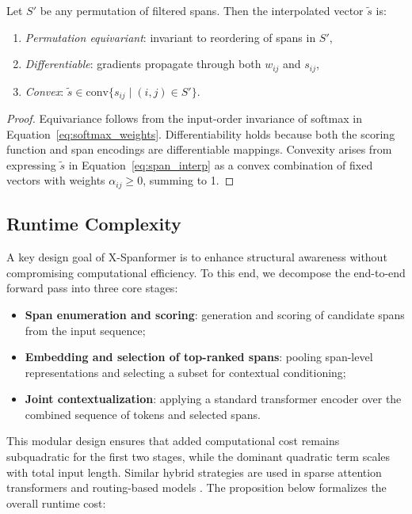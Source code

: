 \begin{proposition}
Let \( S' \) be any permutation of filtered spans. Then the interpolated vector \( \tilde{s} \) is:
\begin{enumerate}
  \item \emph{Permutation equivariant}: invariant to reordering of spans in \( S' \),
  \item \emph{Differentiable}: gradients propagate through both \( w_{ij} \) and \( s_{ij} \),
  \item \emph{Convex}: \( \tilde{s} \in \mathrm{conv}\{s_{ij} \mid (i,j) \in S'\} \).
\end{enumerate}
\end{proposition}

\begin{proof}
Equivariance follows from the input-order invariance of softmax in Equation~\ref{eq:softmax_weights}. Differentiability holds because both the scoring function and span encodings are differentiable mappings. Convexity arises from expressing \( \tilde{s} \) in Equation~\ref{eq:span_interp} as a convex combination of fixed vectors with weights \( \alpha_{ij} \ge 0 \), summing to 1.
\end{proof}

\subsection{Runtime Complexity}

A key design goal of X-Spanformer is to enhance structural awareness without compromising computational efficiency. To this end, we decompose the end-to-end forward pass into three core stages:

\begin{itemize}
  \item \textbf{Span enumeration and scoring}: generation and scoring of candidate spans from the input sequence;
  \item \textbf{Embedding and selection of top-ranked spans}: pooling span-level representations and selecting a subset for contextual conditioning;
  \item \textbf{Joint contextualization}: applying a standard transformer encoder over the combined sequence of tokens and selected spans.
\end{itemize}

This modular design ensures that added computational cost remains subquadratic for the first two stages, while the dominant quadratic term scales with total input length. Similar hybrid strategies are used in sparse attention transformers \cite{beltagy2020longformer, zaheer2020bigbird} and routing-based models \cite{shazeer2017outrageously, ainslie2023transformers}. The proposition below formalizes the overall runtime cost:

